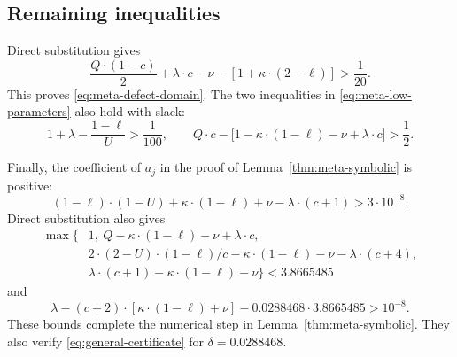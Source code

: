 \subsection{Remaining inequalities}

Direct substitution gives
\[
 \frac{Q\cdot(1-c)}2+\lambda\cdot c-\nu-[1+\kappa\cdot(2-\ell)]
 >\frac1{20}.
\]
This proves \eqref{eq:meta-defect-domain}. The two inequalities in
\eqref{eq:meta-low-parameters} also hold with slack:
\[
 1+\lambda-\frac{1-\ell}{U}>\frac1{100},\qquad
 Q\cdot c-\bigl[1-\kappa\cdot(1-\ell)-\nu+\lambda\cdot c\bigr]>\frac12.
\]

Finally, the coefficient of $a_j$ in the proof of
Lemma~\ref{thm:meta-symbolic} is positive:
\[
 (1-\ell)\cdot(1-U)+\kappa\cdot(1-\ell)+\nu-\lambda\cdot(c+1)
 >3\cdot10^{-8}.
\]
Direct substitution also gives
\begin{equation}
\begin{aligned}
 \max\bigl\{&1,\ Q-\kappa\cdot(1-\ell)-\nu+\lambda\cdot c,\\
 &2\cdot(2-U)\cdot(1-\ell)/c-\kappa\cdot(1-\ell)-\nu-\lambda\cdot(c+4),\\
 &\lambda\cdot(c+1)-\kappa\cdot(1-\ell)-\nu\bigr\}
 <3.8665485
\end{aligned}
\end{equation}
and
\[
 \lambda-(c+2)\cdot[\kappa\cdot(1-\ell)+\nu]
 -0.0288468\cdot3.8665485>10^{-8}.
\]
These bounds complete the numerical step in Lemma~\ref{thm:meta-symbolic}.
They also verify \eqref{eq:general-certificate} for $\delta=0.0288468$.
